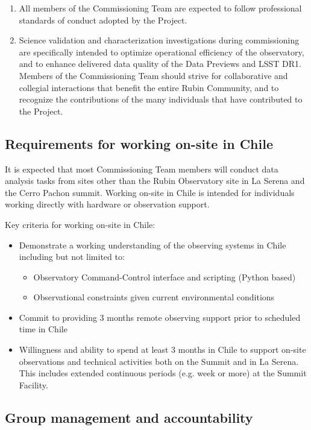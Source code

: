 \documentclass[SE,authoryear,toc]{lsstdoc}
\begin{document}
\begin{enumerate}
\item All members of the Commissioning Team are expected to follow professional standards of conduct adopted by the Project.

\item Science validation and characterization investigations during commissioning are specifically intended to optimize operational efficiency of the observatory, and to enhance delivered data quality of the Data Previews and LSST DR1. Members of the Commissioning Team should strive for collaborative and collegial interactions that benefit the entire Rubin Community, and to recognize the contributions of the many individuals that have contributed to the Project. 

\end{enumerate}

\subsection{Requirements for working on-site in Chile}

It is expected that most Commissioning Team members will conduct data analysis tasks from sites other than the Rubin Observatory site in La Serena and the Cerro Pachon summit. Working on-site in Chile is intended for individuals working directly with hardware or observation support. 

Key criteria for working on-site in Chile:
\begin{itemize}
\item Demonstrate a working understanding of the observing systems in Chile including but not limited to:
	\begin{itemize}
	\item Observatory Command-Control interface and scripting (Python based)
	\item Observational constraints given current environmental conditions
	\end{itemize}
\item Commit to providing 3 months remote observing support prior to scheduled time in Chile
\item Willingness and ability to spend at least 3 months in Chile to support on-site observations and technical activities both on the Summit and in La Serena. This includes extended continuous periods (e.g. week or more) at the Summit Facility.
\end{itemize}

\subsection{Group management and accountability}
\end{document}
